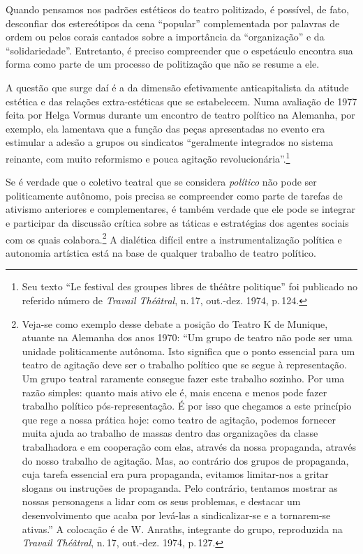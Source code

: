 Quando pensamos nos padrões estéticos do teatro politizado, é possível,
de fato, desconfiar dos estereótipos da cena “popular” complementada por
palavras de ordem ou pelos corais cantados sobre a importância da
“organização” e da “solidariedade”. Entretanto, é preciso compreender
que o espetáculo encontra sua forma como parte de um processo de
politização que não se resume a ele.

A questão que surge daí é a da dimensão efetivamente anticapitalista da
atitude estética e das relações extra-estéticas que se estabelecem. Numa
avaliação de 1977 feita por Helga Vormus durante um encontro de teatro
político na Alemanha, por exemplo, ela lamentava que a função das peças
apresentadas no evento era estimular a adesão a grupos ou sindicatos
“geralmente integrados no sistema reinante, com muito reformismo e pouca
agitação revolucionária”.\footnote{Seu texto “Le festival des groupes
  libres de théâtre politique” foi publicado no referido número de
  {\it Travail Théâtral}, n.\,17, out.-dez. 1974, p.\,124.}

Se é verdade que o coletivo teatral que se considera {\it político} não
pode ser politicamente autônomo, pois precisa se compreender como parte
de tarefas de ativismo anteriores e complementares, é também verdade que
ele pode se integrar e participar da discussão crítica sobre as táticas
e estratégias dos agentes sociais com os quais colabora.\footnote{Veja-se
  como exemplo desse debate a posição do Teatro K de Munique, atuante na
  Alemanha dos anos 1970: “Um grupo de teatro não pode ser uma unidade
  politicamente autônoma. Isto significa que o ponto essencial para um
  teatro de agitação deve ser o trabalho político que se segue à
  representação. Um grupo teatral raramente consegue fazer este trabalho
  sozinho. Por uma razão simples: quanto mais ativo ele é, mais encena e
  menos pode fazer trabalho político pós-representação. É por isso que
  chegamos a este princípio que rege a nossa prática hoje: como teatro
  de agitação, podemos fornecer muita ajuda ao trabalho de massas dentro
  das organizações da classe trabalhadora e em cooperação com elas,
  através da nossa propaganda, através do nosso trabalho de agitação.
  Mas, ao contrário dos grupos de propaganda, cuja tarefa essencial era
  pura propaganda, evitamos limitar-nos a gritar slogans ou instruções
  de propaganda. Pelo contrário, tentamos mostrar as nossas personagens
  a lidar com os seus problemas, e destacar um desenvolvimento que acaba
  por levá-las a sindicalizar-se e a tornarem-se ativas.” A colocação é
  de W. Anraths, integrante do grupo, reproduzida na {\it Travail
  Théâtral}, n.\,17, out.-dez. 1974, p.\,127.} A dialética difícil entre a
instrumentalização política e autonomia artística está na base de
qualquer trabalho de teatro político.

